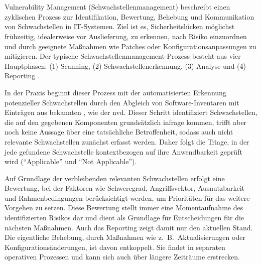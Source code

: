 

\section{}\label{sec:grundlagen-vms}

Vulnerability Management (Schwachstellenmanagement) beschreibt einen zyklischen Prozess zur Identifikation, Bewertung, Behebung und Kommunikation von Schwachstellen in IT-Systemen.
Ziel ist es, Sicherheitslücken möglichst frühzeitig, idealerweise vor Auslieferung, zu erkennen, nach Risiko einzuordnen und durch geeignete Maßnahmen wie Patches oder Konfigurationsanpassungen zu mitigieren.
Der typische Schwachstellenmanagement-Prozess besteht aus vier Hauptphasen: (1) Scanning, (2) Schwachstellenerkennung, (3) Analyse und (4) Reporting \autocite{foreman2019vulnerabilityManagement}.

In der Praxis beginnt dieser Prozess mit der automatisierten Erkennung potenzieller Schwachstellen durch den Abgleich von Software-Inventaren mit Einträgen aus bekannten , wie der \acrshort{nvd}.
Dieser Schritt identifiziert Schwachstellen, die auf den gegebenen Komponenten grundsätzlich infrage kommen, trifft aber noch keine Aussage über eine tatsächliche Betroffenheit, sodass auch nicht relevante Schwachstellen zunächst erfasst werden.
Daher folgt die Triage, in der jede gefundene Schwachstelle kontextbezogen auf ihre Anwendbarkeit geprüft wird (\enquote{Applicable} und \enquote{Not Applicable}).

Auf Grundlage der verbleibenden relevanten Schwachstellen erfolgt eine Bewertung, bei der Faktoren wie Schweregrad, Angriffsvektor, Ausnutzbarkeit und Rahmenbedingungen berücksichtigt werden, um Prioritäten für das weitere Vorgehen zu setzen.
Diese Bewertung stellt immer eine Momentaufnahme des identifizierten Risikos dar und dient als Grundlage für Entscheidungen für die nächsten Maßnahmen.
Auch das Reporting zeigt damit nur den aktuellen Stand.
Die eigentliche Behebung, durch Maßnahmen wie z.\ B.\ Aktualisierungen oder Konfigurationsänderungen, ist davon entkoppelt.
Sie findet in separaten operativen Prozessen und kann sich auch über längere Zeiträume erstrecken.

